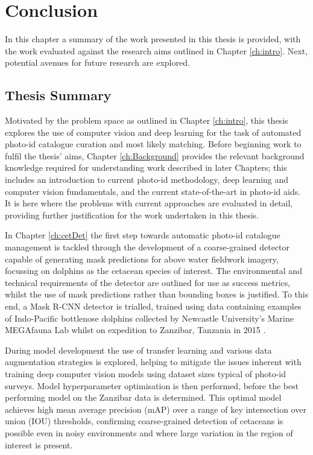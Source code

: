 \chapter{Conclusion}\label{ch:Conclusion}

In this chapter a summary of the work presented in this thesis is provided, with the work evaluated against the research aims outlined in Chapter \ref{ch:intro}. Next, potential avenues for future research are explored. 

\section{Thesis Summary}\label{ch:Conclusion,sec:Summary}

Motivated by the problem space as outlined in Chapter \ref{ch:intro}, this thesis explores the use of computer vision and deep learning for the task of automated photo-id catalogue curation and most likely matching. Before beginning work to fulfil the thesis' aims, Chapter \ref{ch:Background} provides the relevant background knowledge required for understanding work described in later Chapters; this includes an introduction to current photo-id methodology, deep learning and computer vision fundamentals, and the current state-of-the-art in photo-id aids. It is here where the problems with current approaches are evaluated in detail, providing further justification for the work undertaken in this thesis. 

In Chapter \ref{ch:cetDet} the first step towards automatic photo-id catalogue management is tackled through the development of a coarse-grained detector capable of generating mask predictions for above water fieldwork imagery, focussing on dolphins as the cetacean species of interest. The environmental and technical requirements of the detector are outlined for use as success metrics, whilst the use of mask predictions rather than bounding boxes is justified. To this end, a Mask R-CNN \cite{he_mask_2017} detector is trialled, trained using data  containing examples of Indo-Pacific bottlenose dolphins collected by Newcastle University's Marine MEGAfauna Lab whilst on expedition to Zanzibar, Tanzania in 2015 \cite{sharpe_indian_2019}. 

During model development the use of transfer learning and various data augmentation strategies is explored, helping to mitigate the issues inherent with training deep computer vision models using dataset sizes typical of photo-id surveys. Model hyperparameter optimisation is then performed, before the best performing model on the Zanzibar data is determined. This optimal model achieves high mean average precision (mAP) over a range of key intersection over union (IOU) thresholds, confirming coarse-grained detection of cetaceans is possible even in noisy environments and where large variation in the region of interest is present. 

